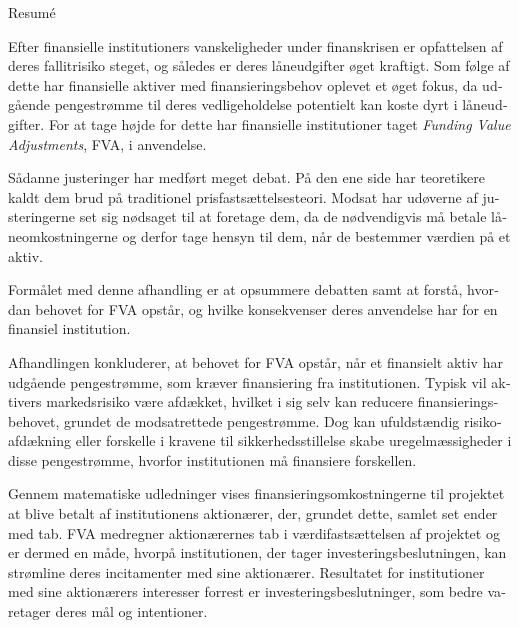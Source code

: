 \documentclass[main.tex]{subfiles}
\begin{document}
    \begin{otherlanguage}{danish}
    \thispagestyle{empty}
    \begin{center}
    {\LARGE Resumé}
    \end{center}

    Efter finansielle institutioners vanskeligheder under finanskrisen 
    er opfattelsen af deres fallitrisiko steget, og således er deres låneudgifter øget kraftigt.
    Som følge af dette har finansielle aktiver med finansieringsbehov oplevet et øget fokus, 
    da udgående pengestrømme til deres vedligeholdelse potentielt kan koste dyrt i låneudgifter.
    For at tage højde for dette har finansielle institutioner taget 
    \textit{Funding Value Adjustments}, FVA, i anvendelse.

    Sådanne justeringer har medført meget debat. 
    På den ene side har teoretikere kaldt dem brud på traditionel prisfastsættelsesteori.
    Modsat har udøverne af justeringerne set sig nødsaget til at foretage dem,
    da de nødvendigvis må betale låneomkostningerne 
    og derfor tage hensyn til dem, når de bestemmer værdien på et aktiv. 

    Formålet med denne afhandling er at opsummere debatten
    samt at forstå, hvordan behovet for FVA opstår, 
    og hvilke konsekvenser deres anvendelse har for en finansiel institution. 

    Afhandlingen konkluderer, at behovet for FVA opstår, 
    når et finansielt aktiv har udgå\-ende pengestrømme, som kræver finansiering fra institutionen.
    Typisk vil aktivers markedsrisiko være afdækket,
    hvilket i sig selv kan reducere finansieringsbehovet, grundet de modsatrettede pengestrømme.
    Dog kan ufuldstændig risikoafdækning eller forskelle i kravene til sikkerhedsstillelse
    skabe uregelmæssigheder i disse pengestrømme, hvorfor institutionen må finansiere forskellen.
    
    Gennem matematiske udledninger vises finansieringsomkostningerne til projektet
    at blive betalt af institutionens aktionærer,
    der, grundet dette, samlet set ender med tab.
    FVA medregner aktionærernes tab i værdifastsættelsen af projektet
    og er dermed en måde, hvorpå institutionen, der tager investeringsbeslutningen, 
    kan strømline deres incitamenter med sine aktionærer. 
    Resultatet for institutioner med sine aktionærers interesser forrest
    er investeringsbeslutninger, som bedre varetager deres mål og intentioner.
    
    \end{otherlanguage}
\end{document}
